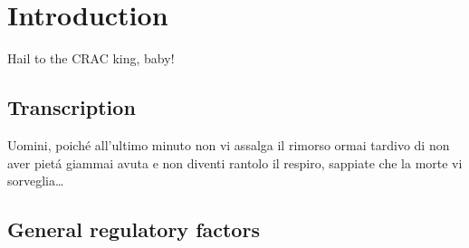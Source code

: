 \documentclass{Thesis}
\begin{document}
\frontmatter

\part{Introduction}

\begin{savequote}[70mm]
Hail to the CRAC king, baby!
\end{savequote}

\chapter{Transcription}


	
	
	
	

\begin{savequote}[70mm]
Uomini, poich\'{e} all'ultimo minuto non vi assalga il rimorso ormai tardivo di non aver piet\'{a} giammai avuta e non diventi rantolo il respiro, sappiate che la morte vi sorveglia\ldots
{} 
\end{savequote}

\chapter{General regulatory factors}


	
	
	


%
%
%



\singlespacing


\end{document}
